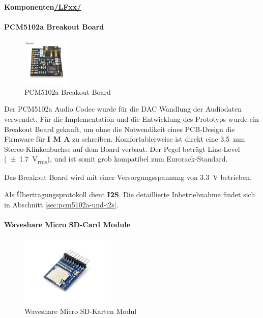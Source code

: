 \newpage

\textbf{Komponenten\hyperlink{}{/LFxx/}} \\

\paragraph{PCM5102a Breakout Board}

\begin{figure} %
	\vspace{-20pt}
	\includegraphics[width=0.2\textwidth]{images/05_technische_spezifikation/audio/pcm5102a_breakout.jpg}
	\caption{PCM5102a Breakout Board}
	\label{fig:pcm5102a_breakout}
\end{figure}

Der PCM5102a Audio Codec wurde für die DAC Wandlung der Audiodaten verwendet. Für die Implementation und die Entwicklung des Prototyps wurde ein Breakout Board gekauft, um ohne die Notwendikeit eines PCB-Design die Firmware für \textbf{I M A} zu schreiben. 
Komfortablerweise ist direkt eine \SI{3,5}{\milli\meter} Stereo-Klinkenbuchse auf dem Board verbaut.
Der Pegel beträgt Line-Level (\SI{\pm 1.7}{\volt_{rms}}), und ist somit grob kompatibel zum Eurorack-Standard.

Das Breakout Board wird mit einer Versorgungsspannung von \SI{3,3}{\volt} betrieben.

Als Übertragungsprotokoll dient \textbf{I2S}. Die detaillierte Inbetriebnahme findet sich in Abschnitt \ref{sec:pcm5102a-und-i2s}.


\paragraph{Waveshare Micro SD-Card Module}

\begin{figure} %
	\vspace{-20pt}
	\includegraphics[width=0.4\textwidth]{images/05_technische_spezifikation/audio/waveshare_micro_sd_module.jpg}
	\caption{Waveshare Micro SD-Karten Modul}
	\label{fig:waveshare_micro_sd_module}
\end{figure}

